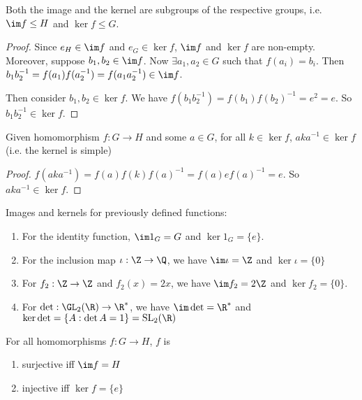 \documentclass[a4paper]{article}
\begin{document}
  \begin{prop}
    Both the image and the kernel are subgroups of the respective groups, i.e. $\im f\leq H$ and $\ker f \leq G$.
  \end{prop}

  \begin{proof}
    Since $e_H\in \im f$ and $e_G\in \ker f$, $\im f$ and $\ker f$ are non-empty. Moreover, suppose $b_1, b_2\in \im f$. Now $\exists a_1, a_2 \in G$ such that $f(a_i) = b_i$. Then $b_1b_2^{-1} = f(a_1)f(a_2^{-1}) = f(a_1a_2^{-1})\in \im f$. 

    Then consider $b_1,b_2\in \ker f$. We have $f(b_1b_2^{-1}) = f(b_1)f(b_2)^{-1} = e^2 = e$. So $b_1b_2^{-1}\in \ker f$.
  \end{proof}

  \begin{prop}
    Given homomorphism $f:G\rightarrow H$ and some $a\in G$, for all $k\in \ker f$, $aka^{-1}\in\ker f$ (i.e. the kernel is simple)
  \end{prop}

  \begin{proof}
    $f(aka^{-1}) = f(a)f(k)f(a)^{-1} = f(a)ef(a)^{-1} = e$. So $aka^{-1}\in \ker f$.
  \end{proof}

  \begin{eg}
    Images and kernels for previously defined functions:
    \begin{enumerate}
      \item For the identity function, $\im 1_G = G$ and $\ker 1_G = \{e\}$.
      \item For the inclusion map $\iota: \Z\rightarrow\Q$, we have $\im \iota = \Z$ and $\ker \iota = \{0\}$
      \item For $f_2:\Z\rightarrow\Z$ and $f_2(x) = 2x$, we have $\im f_2 = 2\Z$ and $\ker f_2 = \{0\}$.
      \item For $\det: \GL_2(\R) \rightarrow \R^*$, we have $\im \det = \R^*$ and $\ker \det = \{A:\det A = 1\} = \mathrm{SL}_2(\R)$
    \end{enumerate}
  \end{eg}
  \begin{prop}
    For all homomorphisms $f:G\rightarrow H$, $f$ is
    \begin{enumerate}
      \item surjective iff $\im f = H$
      \item injective iff $\ker f = \{e\}$
    \end{enumerate}
  \end{prop}
\end{document}
